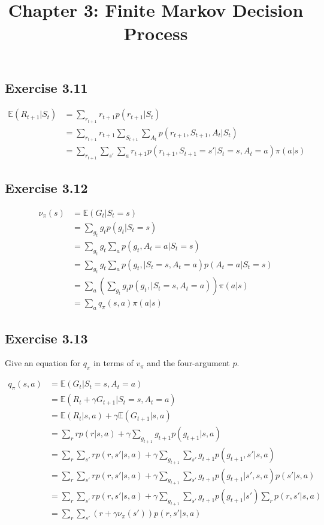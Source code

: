 \documentclass[12pt]{amsart}
\title{Chapter 3: Finite Markov Decision Process}
\begin{document}
\maketitle

\subsection*{Exercise 3.11}

\begin{align*}
	\mathbb{E}(R_{t+1}|S_t) &= \sum_{r_{t+1}} r_{t+1}p(r_{t+1}|S_t) \\
	&= \sum_{r_{t+1}} r_{t+1} \sum_{S_{t+1}} \sum _{A_t} p(r_{t+1}, S_{t+1}, A_t | S_t) \\
	&= \sum_{r_{t+1}} \sum_{s'} \sum _{a} r_{t+1} p(r_{t+1}, S_{t+1} = s'|S_t=s, A_t=a) \pi(a|s)
\end{align*}

\subsection*{Exercise 3.12}

\begin{align*}
\nu_{\pi}(s) &= \mathbb{E}(G_t|S_t=s) \\
&= \sum_{g_t} g_t p(g_t|S_t=s) \\
&= \sum_{g_t} g_t \sum_a p(g_t, A_t=a | S_t =s) \\
&= \sum_{g_t} g_t \sum_a p(g_t, | S_t =s, A_t=a) p(A_t =a | S_t= s) \\
&= \sum_a \left ( \sum_{g_t} g_t p(g_t, | S_t =s, A_t=a) \right) \pi(a|s) \\
&= \sum_a q_{\pi}(s,a) \pi(a|s)
\end{align*}

\subsection*{Exercise 3.13}

Give an equation for $q_{\pi}$ in terms of $v_{\pi}$ and the four-argument $p$.

\begin{align*}
q_{\pi}(s,a) &= \mathbb{E}(G_t|S_t=s, A_t=a) \\
	&= \mathbb{E}(R_t + \gamma G_{t+1} | S_t = s, A_t = a) \\
	&= \mathbb{E}(R_t|s, a) + \gamma \mathbb{E}(G_{t+1}|s, a) \\
	&= \sum_r r p(r|s,a) + \gamma \sum_{g_{t+1}} g_{t+1} p(g_{t+1}|s,a) \\
	&= \sum_r \sum_{s'} r p(r, s'|s, a) + \gamma \sum_{g_{t+1}} \sum_{s'} g_{t+1} p(g_{t+1}, s' | s, a) \\
	&= \sum_r \sum_{s'} r p(r, s'|s, a) + \gamma \sum_{g_{t+1}} \sum_{s'} g_{t+1} p(g_{t+1}|s', s, a) p(s'|s, a) \\
	&= \sum_r \sum_{s'} r p(r, s'|s, a) + \gamma \sum_{g_{t+1}} \sum_{s'} g_{t+1} p(g_{t+1}|s') \sum_{r} p(r, s'|s, a) \\
	&= \sum_r \sum_{s'} \left( r  + \gamma \nu_{\pi}(s') \right) p(r, s' | s, a)
\end{align*}
\end{document}
